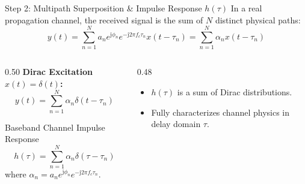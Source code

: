 \documentclass[10pt,aspectratio=169]{beamer}
\newcommand{\jj}{\mathrm{j}}
\begin{document}
\begin{frame}{Step 2: Multipath Superposition \& Impulse Response $h(\tau)$}
  In a real propagation channel, the received signal is the sum of $N$ distinct physical paths:
  \begin{equation}
    y(t) = \sum_{n=1}^{N} a_n e^{\jj\phi_n} e^{-\jj 2\pi f_c \tau_n} x(t - \tau_n) = \sum_{n=1}^{N} \alpha_n x(t - \tau_n)
  \end{equation}

  \begin{columns}[T]
    \begin{column}{0.50\textwidth}
      \textbf{Dirac Excitation $x(t) = \delta(t)$:}
      \begin{equation}
        y(t) = \sum_{n=1}^{N} \alpha_n \delta(t - \tau_n)
      \end{equation}
      \begin{block}{Baseband Channel Impulse Response}
        \begin{equation}
          \boxed{h(\tau) = \sum_{n=1}^{N} \alpha_n \delta(\tau - \tau_n)}
        \end{equation}
        where $\alpha_n = a_n e^{\jj\phi_n} e^{-\jj 2\pi f_c \tau_n}$.
      \end{block}
    \end{column}

    \begin{column}{0.48\textwidth}
      \begin{itemize}
        \item $h(\tau)$ is a sum of Dirac distributions.
        \item Fully characterizes channel physics in delay domain $\tau$.
      \end{itemize}
    \end{column}
  \end{columns}
\end{frame}
\end{document}
